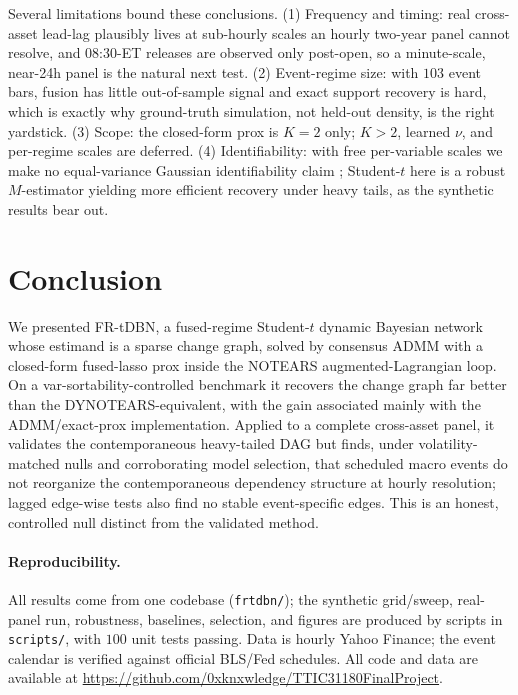 \documentclass{article}
\begin{document}
Several limitations bound these conclusions. (1) Frequency and timing: real
cross-asset lead-lag plausibly lives at sub-hourly scales an hourly two-year panel
cannot resolve, and 08:30-ET releases are observed only post-open, so a minute-scale,
near-24h panel is the natural next test. (2) Event-regime size: with $103$ event
bars, fusion has little out-of-sample signal and exact support recovery is hard, which
is exactly why ground-truth simulation, not held-out density, is the right yardstick.
(3) Scope: the closed-form prox is $K{=}2$ only; $K>2$, learned $\nu$, and
per-regime scales are deferred. (4) Identifiability: with free per-variable
scales we make no equal-variance Gaussian identifiability claim
\citep{peters2014identifiability}; Student-$t$ here is a robust $M$-estimator yielding
more efficient recovery under heavy tails, as the synthetic results bear out.

\section{Conclusion}
We presented FR-tDBN, a fused-regime Student-$t$ dynamic Bayesian network whose
estimand is a sparse change graph, solved by consensus ADMM with a closed-form
fused-lasso prox inside the NOTEARS augmented-Lagrangian loop. On a
var-sortability-controlled benchmark it recovers the change graph far better than the
DYNOTEARS-equivalent, with the gain associated mainly with the ADMM/exact-prox
implementation. Applied to a complete cross-asset panel, it validates the
contemporaneous heavy-tailed DAG but finds, under volatility-matched nulls and
corroborating model selection, that scheduled macro events do not reorganize the
contemporaneous dependency structure at hourly resolution; lagged edge-wise tests also
find no stable event-specific edges. This is an honest, controlled null distinct from
the validated method.

\paragraph{Reproducibility.} All results come from one codebase (\texttt{frtdbn/});
the synthetic grid/sweep, real-panel run, robustness, baselines, selection, and figures
are produced by scripts in \texttt{scripts/}, with $100$ unit tests passing. Data is
hourly Yahoo Finance; the event calendar is verified against official BLS/Fed schedules.
All code and data are available at \url{https://github.com/0xknxwledge/TTIC31180FinalProject}.
\end{document}
